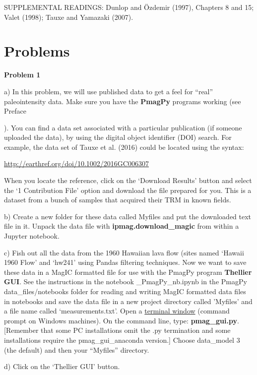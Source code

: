 \noindent SUPPLEMENTAL READINGS: Dunlop and \"Ozdemir (1997), Chapters 8 and 15; \nocite{dunlop97}
Valet (1998); \nocite{valet98}
Tauxe and Yamazaki (2007). \nocite{tauxe07}


\section{Problems}

{{\parindent 0pt  \parskip 12pt

{\bf Problem 1 }

a)  In this problem, we will use published data to get a feel for ``real'' paleointensity data.  Make sure you have the {\bf PmagPy} programs working (see Preface}).  You can find a data set associated with a particular publication (if someone uploaded the data), by using the digital object identifier (DOI) search.  For example, the data set of Tauxe et al. (2016)  \nocite{tauxe16} could be located using the syntax:   

\url{http://earthref.org/doi/10.1002/2016GC006307} 	
	
When you locate the reference, click on the `Download Results' button and select the `1 Contribution File' option and download the file prepared for you.     This is a dataset  from a bunch of samples that acquired their TRM in known fields.   

b) Create a new folder for these data called Myfiles and put the downloaded text file in it.  Unpack the data file with {\bf ipmag.download\_magic} from within a Jupyter notebook.  

c) Fish out all the data from the 1960 Hawaiian lava flow (sites named `Hawaii 1960 Flow' and `hw241' using Pandas filtering techniques. Now we want to save these data in a MagIC formatted file for use with the PmagPy program  {\bf Thellier GUI}.  See the instructions in the notebook \_PmagPy\_nb.ipynb in the PmagPy data\_files/notebooks folder for reading and writing MagIC formatted data files in notebooks and save the data file in a new project directory called 'Myfiles' and a file name called `measurements.txt'.   Open a \href{http://earthref.org/PmagPy/#command_line}{terminal window} (command prompt on Windows machines).    On the command line,  type:  {\bf pmag\_gui.py}. [Remember that some PC installations omit the .py termination and some installations require the pmag\_gui\_anaconda version.]  Choose data\_model 3 (the default) and  then your ``Myfiles'' directory. 

d)  Click on the `Thellier GUI' button.  

}
